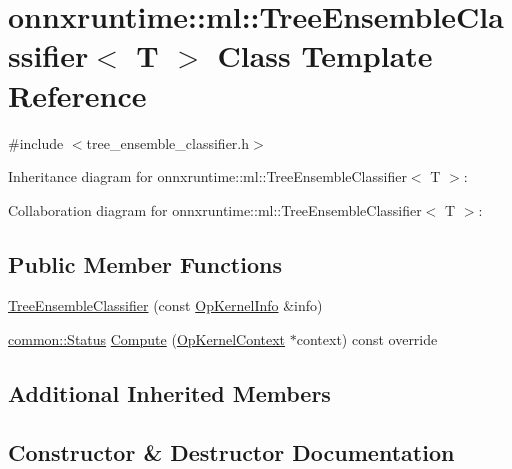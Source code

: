 \hypertarget{classonnxruntime_1_1ml_1_1TreeEnsembleClassifier}{}\section{onnxruntime\+:\+:ml\+:\+:Tree\+Ensemble\+Classifier$<$ T $>$ Class Template Reference}
\label{classonnxruntime_1_1ml_1_1TreeEnsembleClassifier}


{\ttfamily \#include $<$tree\+\_\+ensemble\+\_\+classifier.\+h$>$}



Inheritance diagram for onnxruntime\+:\+:ml\+:\+:Tree\+Ensemble\+Classifier$<$ T $>$\+:


Collaboration diagram for onnxruntime\+:\+:ml\+:\+:Tree\+Ensemble\+Classifier$<$ T $>$\+:
\subsection*{Public Member Functions}
\begin{DoxyCompactItemize}
\item 
\mbox{\hyperlink{classonnxruntime_1_1ml_1_1TreeEnsembleClassifier_aa1b34ff6969e8699e4ad50fd907af995}{Tree\+Ensemble\+Classifier}} (const \mbox{\hyperlink{classonnxruntime_1_1OpKernelInfo}{Op\+Kernel\+Info}} \&info)
\item 
\mbox{\hyperlink{classonnxruntime_1_1common_1_1Status}{common\+::\+Status}} \mbox{\hyperlink{classonnxruntime_1_1ml_1_1TreeEnsembleClassifier_a324a0a2464c55eabc8c3b562929b2b84}{Compute}} (\mbox{\hyperlink{classonnxruntime_1_1OpKernelContext}{Op\+Kernel\+Context}} $\ast$context) const override
\end{DoxyCompactItemize}
\subsection*{Additional Inherited Members}


\subsection{Constructor \& Destructor Documentation}
\mbox{\label{classonnxruntime_1_1ml_1_1TreeEnsembleClassifier_aa1b34ff6969e8699e4ad50fd907af995}} 

